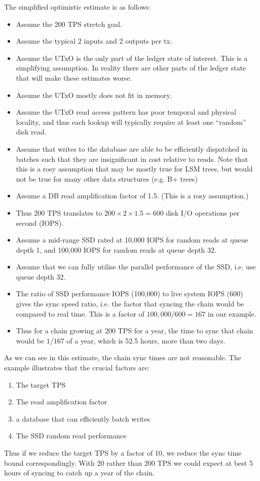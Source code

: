 \documentclass[11pt,a4paper]{article}
\begin{document}
The simplified optimistic estimate is as follows:
\begin{itemize}
\item Assume the 200 TPS stretch goal.
\item Assume the typical 2 inputs and 2 outputs per tx.
\item Assume the UTxO is the only part of the ledger state of interest. This is
      a simplifying assumption. In reality there are other parts of the ledger
      state that will make these estimates worse.
\item Assume the UTxO mostly does not fit in memory.
\item Assume the UTxO read access pattern has poor temporal and physical
      locality, and thus each lookup will typically require at least one
      ``random'' disk read.
\item Assume that writes to the database are able to be efficiently dispatched
        in batches such that they are insignificant in cost relative to reads.
        Note that this is a rosy assumption that may be mostly true for LSM trees,
        but would not be true for many other data structures (e.g. B+ trees)
\item Assume a DB read amplification factor of 1.5. (This is a rosy assumption.)
\item Thus 200 TPS translates to $200 \times 2 \times 1.5 = 600$ disk I/O operations per
      second (IOPS).
\item Assume a mid-range SSD rated at 10,000 IOPS for random reads at queue
      depth 1, and 100,000 IOPS for random reads at queue depth 32.
\item Assume that we can fully utilise the parallel performance of the SSD,
      i.e. use queue depth 32.
\item The ratio of SSD performance IOPS (100,000) to live system IOPS (600)
      gives the sync speed ratio, i.e. the factor that syncing the chain would
      be compared to real time. This is a factor of $100,000 / 600 = 167$ in
      our example.
\item Thus for a chain growing at 200 TPS for a year, the time to sync that
      chain would be $1/167$ of a year, which is 52.5 hours, more than two days.
\end{itemize}

As we can see in this estimate, the chain sync times are not reasonable.
The example illustrates that the crucial factors are:
\begin{enumerate}
\item The target TPS
\item The read amplification factor
\item a database that can efficiently batch writes
\item The SSD random read performance
\end{enumerate}
Thus if we reduce the target TPS by a factor of 10, we reduce the sync time bound
correspondingly. With 20 rather than 200 TPS we could expect at best 5 hours of syncing
to catch up a year of the chain.
\end{document}
